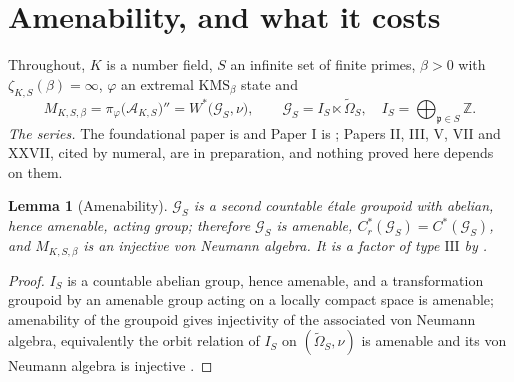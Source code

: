 \documentclass[11pt]{amsart}
\numberwithin{equation}{section}
\newtheorem{lemma}[theorem]{Lemma}
\theoremstyle{definition}
\theoremstyle{remark}
\newcommand{\Z}{\mathbb{Z}}
\newcommand{\cA}{\mathcal{A}}
\newcommand{\cG}{\mathcal{G}}
\newcommand{\pp}{\mathfrak{p}}
\begin{document}
\maketitle

\tableofcontents

\section{Amenability, and what it costs}

Throughout, $K$ is a number field, $S$ an infinite set of finite primes, $\beta>0$ with
$\zeta_{K,S}(\beta)=\infty$, $\varphi$ an extremal $\mathrm{KMS}_\beta$ state and
\[
M_{K,S,\beta}=\pi_\varphi\bigl(\cA_{K,S}\bigr)''=W^*\bigl(\cG_S,\nu\bigr),
\qquad \cG_S=I_S\ltimes\widetilde\Omega_S,\quad I_S=\bigoplus_{\pp\in S}\Z .
\]
\emph{The series.} The foundational paper is \cite{Main} and Paper I is \cite{SeriesI};
Papers II, III, V, VII and XXVII, cited by numeral, are in preparation, and nothing proved
here depends on them.


\begin{lemma}[Amenability]\label{lem:amenable}
$\cG_S$ is a second countable étale groupoid with abelian, hence amenable, acting group;
therefore $\cG_S$ is amenable, $C^*_r(\cG_S)=C^*(\cG_S)$, and $M_{K,S,\beta}$ is an injective
von Neumann algebra. It is a factor of type $\mathrm{III}$ by \cite[Prop.~6.1]{Main}.
\end{lemma}

\begin{proof}
$I_S$ is a countable abelian group, hence amenable, and a transformation groupoid by an
amenable group acting on a locally compact space is amenable; amenability of the groupoid
gives injectivity of the associated von Neumann algebra, equivalently the orbit relation
of $I_S$ on $(\widetilde\Omega_S,\nu)$ is amenable and its von Neumann algebra
\cite{FM} is injective \cite{CFW}.
\end{proof}
\end{document}
